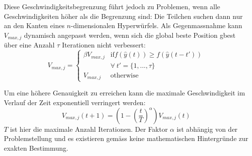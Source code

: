 Diese Geschwindigkeitsbegrenzung führt jedoch zu Problemen, wenn alle Geschwindigkeiten höher als die Begrenzung sind: Die Teilchen suchen dann nur an den Kanten eines $n$-dimensionalen Hyperwürfels. Als Gegenmassnahme kann $V_{max,j}$ dynamisch angepasst werden, wenn sich die global beste Position gbest über eine Anzahl $\tau$ Iterationen nicht verbessert:
\begin{equation}
	V_{max,j} = 
	\begin{cases}
		\beta V_{max,j} & \text{if} f(\hat{y}(t)) \geq f(\hat{y}(t-t')) \\
			& \forall \: t' = \{ 1, ..., \tau \} \\
		V_{max,j} & \text{otherwise}
	\end{cases}
\end{equation}

Um eine höhere Genauigkeit zu erreichen kann die maximale Geschwindigkeit im Verlauf der Zeit exponentiell verringert werden:
\begin{equation}
	V_{max,j}(t+1) = \left(1-\left(\frac{t}{T}\right)^{\alpha}\right) V_{max,j}(t)
\end{equation}
$T$ ist hier die maximale Anzahl Iterationen. Der Faktor $\alpha$ ist abhängig von der Problemstellung und es existieren gemäss \cite{Han-Modification} keine mathematischen Hintergründe zur exakten Bestimmung. \\